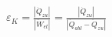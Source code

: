 \( \varepsilon_K = \frac{|\dot{Q}_{zu}|}{|\dot{W}_{el}|} = \frac{|\dot{Q}_{zu}|}{|\dot{Q}_{abl} - \dot{Q}_{zu}|} \)